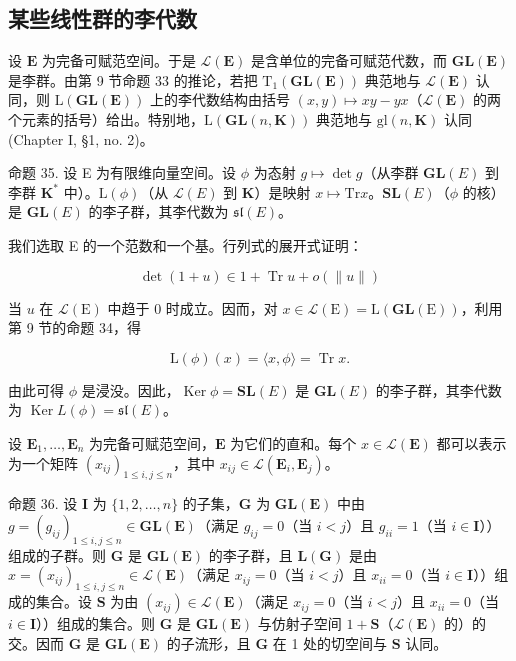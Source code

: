 \subsection{某些线性群的李代数}

设 \(\mathbf{E}\) 为完备可赋范空间。于是 \(\mathcal{L}(\mathbf{E})\) 是含单位的完备可赋范代数，而 \(\mathbf{GL}(\mathbf{E})\) 是李群。由第 9 节命题 33 的推论，若把 \(\mathrm{T}_{1}(\mathbf{GL}(\mathbf{E}))\) 典范地与 \(\mathcal{L}(\mathbf{E})\) 认同，则 \(\mathrm{L}(\mathbf{GL}(\mathbf{E}))\) 上的李代数结构由括号 \((x,y)\mapsto xy - yx\)（\(\mathcal{L}(\mathbf{E})\) 的两个元素的括号）给出。特别地，\(\mathrm{L}(\mathbf{GL}(n,\mathbf{K}))\) 典范地与 \(\mathrm{gl}(n,\mathbf{K})\) 认同 (Chapter I, §1, no. 2)。

命题 35. 设 E 为有限维向量空间。设 \(\phi\) 为态射 \(g \mapsto \det g\)（从李群 \(\mathbf{GL}(E)\) 到李群 \(\mathbf{K}^*\) 中）。\(\mathrm{L}(\phi)\)（从 \(\mathcal{L}(E)\) 到 \(\mathbf{K}\)）是映射 \(x \mapsto \mathrm{Tr}x\)。\(\mathbf{SL}(E)\)（\(\phi\) 的核）是 \(\mathbf{GL}(E)\) 的李子群，其李代数为 \(\mathfrak{sl}(E)\)。

我们选取 E 的一个范数和一个基。行列式的展开式证明：

\[
\det (1 + u) \in 1 + \operatorname{Tr} u + o (\| u \|)
\]

当 \(u\) 在 \(\mathcal{L}(\mathrm{E})\) 中趋于 0 时成立。因而，对 \(x \in \mathcal{L}(\mathrm{E}) = \mathrm{L}(\mathbf{GL}(\mathrm{E}))\)，利用第 9 节的命题 34，得

\[
\mathrm{L} (\phi) (x) = \langle x, \phi \rangle = \operatorname{Tr} x.
\]

由此可得 \(\phi\) 是浸没。因此，\(\operatorname{Ker} \phi = \mathbf{SL}(E)\) 是 \(\mathbf{GL}(E)\) 的李子群，其李代数为 \(\operatorname{Ker} L(\phi) = \mathfrak{sl}(E)\)。

设 \(\mathbf{E}_1, \ldots, \mathbf{E}_n\) 为完备可赋范空间，\(\mathbf{E}\) 为它们的直和。每个 \(x \in \mathcal{L}(\mathbf{E})\) 都可以表示为一个矩阵 \((x_{ij})_{1 \leqslant i, j \leqslant n}\)，其中 \(x_{ij} \in \mathcal{L}(\mathbf{E}_i, \mathbf{E}_j)\)。

命题 36. 设 \(\mathbf{I}\) 为 \(\{1,2,\ldots,n\}\) 的子集，\(\mathbf{G}\) 为 \(\mathbf{GL}(\mathbf{E})\) 中由 \(g = (g_{ij})_{1\leqslant i,j\leqslant n}\in \mathbf{GL}(\mathbf{E})\)（满足 \(g_{ij} = 0\)（当 \(i < j\)）且 \(g_{ii} = 1\)（当 \(i\in \mathbf{I}\)））组成的子群。则 \(\mathbf{G}\) 是 \(\mathbf{GL}(\mathbf{E})\) 的李子群，且 \(\mathbf{L}(\mathbf{G})\) 是由 \(x = (x_{ij})_{1\leqslant i,j\leqslant n}\in \mathcal{L}(\mathbf{E})\)（满足 \(x_{ij} = 0\)（当 \(i < j\)）且 \(x_{ii} = 0\)（当 \(i\in \mathbf{I}\)））组成的集合。设 \(\mathbf{S}\) 为由 \((x_{ij})\in \mathcal{L}(\mathbf{E})\)（满足 \(x_{ij} = 0\)（当 \(i < j\)）且 \(x_{ii} = 0\)（当 \(i\in \mathbf{I}\)））组成的集合。则 \(\mathbf{G}\) 是 \(\mathbf{GL}(\mathbf{E})\) 与仿射子空间 \(1 + \mathbf{S}\)（\(\mathcal{L}(\mathbf{E})\) 的）的交。因而 \(\mathbf{G}\) 是 \(\mathbf{GL}(\mathbf{E})\) 的子流形，且 \(\mathbf{G}\) 在 1 处的切空间与 \(\mathbf{S}\) 认同。

